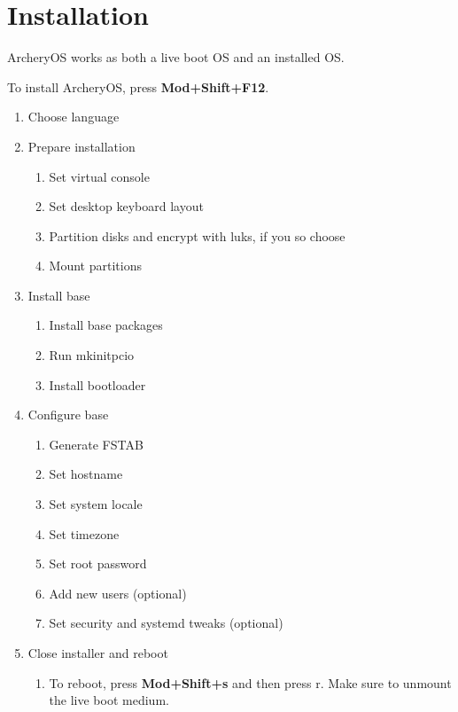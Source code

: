 \documentclass{article}
\begin{document}
\pagebreak
\section{Installation}
ArcheryOS works as both a live boot OS and an installed OS.\@

\noindent
To install ArcheryOS, press \textbf{Mod+Shift+F12}.


\begin{enumerate}\bfseries
	\item Choose language
	\item Prepare installation
	\begin{enumerate}\bfseries
		\item Set virtual console
		\item Set desktop keyboard layout
		\item Partition disks and encrypt with luks, if you so choose
		\item Mount partitions
	\end{enumerate}
	\item Install base
	\begin{enumerate}\bfseries
		\item Install base packages
		\item Run mkinitpcio
		\item Install bootloader
	\end{enumerate}
	\item Configure base
	\begin{enumerate}\bfseries
		\item Generate FSTAB
		\item Set hostname
		\item Set system locale
		\item Set timezone
		\item Set root password
		\item Add new users (optional)
		\item Set security and systemd tweaks (optional)
	\end{enumerate}
	\item Close installer and reboot
	\begin{enumerate}\bfseries
		\item To reboot, press \textbf{Mod+Shift+s} and then press r. Make sure to unmount the live boot medium.
	\end{enumerate}
\end{enumerate}

\pagebreak
\end{document}
